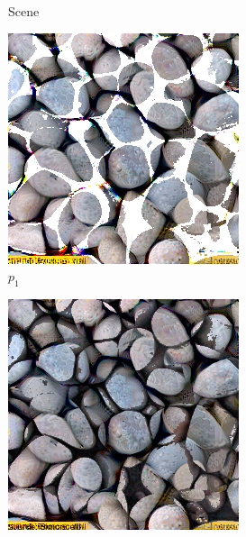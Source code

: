 \begin{figure}[ht]
\begin{subfigure}{\textwidth}
\begin{subfigure}{0.2\textwidth}
            \caption*{Scene}
            \label{fig:intro_pixels_vs_stats-pixels_bg}
        \end{subfigure}
        \hfill
        \begin{subfigure}{0.2\textwidth}
            \centering
            \includegraphics[width=\textwidth]{images/01-pixels_vs_stats-pixels_opt.jpg}
            \caption*{\(p_1\)}
            \label{fig:intro_pixels_vs_stats-pixels_opt}
        \end{subfigure}
        \hfill
        \begin{subfigure}{0.2\textwidth}
            \centering
            \includegraphics[width=\textwidth]{images/01-pixels_vs_stats-pixels_proj.jpg}

\end{subfigure}
\end{subfigure}
\end{figure}
